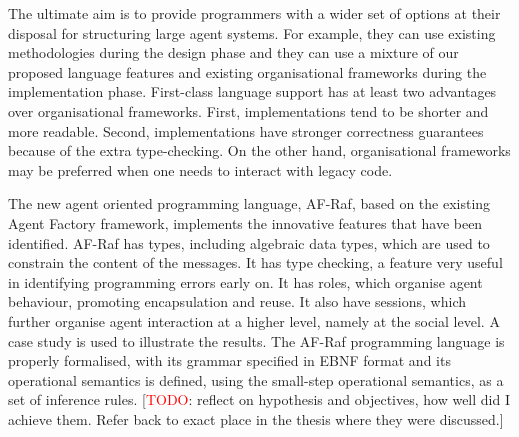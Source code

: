 \documentclass[a4paper,12pt,oneside,fleqn]{book} %
\newcommand{\todo}[1]{[\textcolor{red}{TODO}: #1]}
\begin{document}
The ultimate aim is to provide programmers with a wider set of options at
their disposal for structuring large agent systems. For example, they can
use existing methodologies during the design phase and they can use a
mixture of our proposed language features and existing organisational
frameworks during the implementation phase. First-class language support
has at least two advantages over organisational frameworks. First,
implementations tend to be shorter and more readable. Second,
implementations have stronger correctness guarantees because of the extra
type-checking. On the other hand, organisational frameworks may be
preferred when one needs to interact with legacy code.

The new agent oriented programming language, AF-Raf, based on the existing
Agent Factory framework, implements the innovative features that have been
identified. AF-Raf has types, including algebraic data types, which are
used to constrain the content of the messages. It has type checking, a
feature very useful in identifying programming errors early on. It has
roles, which organise agent behaviour, promoting encapsulation and reuse.
It also have sessions, which further organise agent interaction at a higher
level, namely at the social level. A case study is used to illustrate the
results. The AF-Raf programming language is properly formalised, with its
grammar specified in EBNF format and its operational semantics is defined,
using the small-step operational semantics, as a set of inference rules.
\todo{reflect on hypothesis and objectives, how well did I achieve them.
Refer back to exact place in the thesis where they were discussed.}


\appendix
\end{document}
